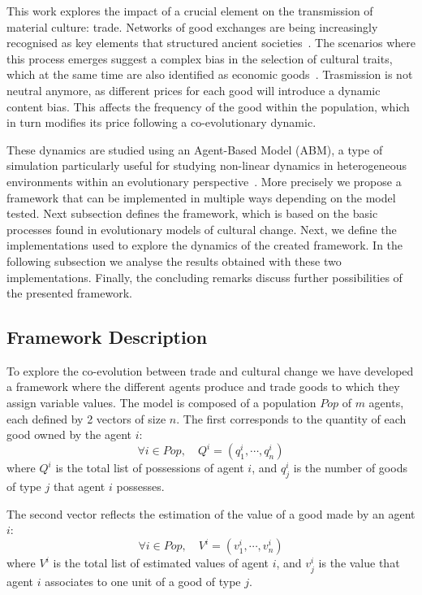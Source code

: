 \documentclass[a4paper]{article}
\begin{document}
This work explores the impact of a crucial element on the transmission of material culture: trade. Networks of good exchanges are being increasingly recognised as key elements that structured ancient societies~\cite{temin_market_2001,remesal_epnet_2014,brughmans_connecting_2010}. The scenarios where this process emerges suggest a complex bias in the selection of cultural traits, which at the same time are also identified as economic goods~\cite{bentley_specialisation_2005,macmillan_agent-based_2008}. Trasmission is not neutral anymore, as different prices for each good will introduce a dynamic content bias. This affects the frequency of the good within the population, which in turn modifies its price following a co-evolutionary dynamic.

These dynamics are studied using an Agent-Based Model (ABM), a type of simulation particularly useful for studying non-linear dynamics in heterogeneous environments within an evolutionary perspective~\cite{lake_trends_2014}. More precisely we propose a framework that can be implemented in multiple ways depending on the model tested. Next subsection defines the framework, which is based on the basic processes found in evolutionary models of cultural change. Next, we define the implementations used to explore the dynamics of the created framework. In the following subsection we analyse the results obtained with these two implementations. Finally, the concluding remarks discuss further possibilities of the presented framework.

\subsection{Framework Description}

To explore the co-evolution between trade and cultural change we have developed a framework where the different agents produce and trade goods to which they assign variable values. The model is composed of a population $Pop$ of $m$ agents, each defined by 2 vectors of size $n$. The first corresponds to the quantity of each good owned by the agent $i$: 
$$\forall i \in Pop, \quad Q^i = (q^i_1,\cdots,q^i_n) $$
where $Q^i$ is the total list of possessions of agent $i$, and $q^i_j$ is the number of goods of type $j$ that agent $i$ possesses.

The second vector reflects the estimation of the value of a good made by an agent $i$:
$$\forall i \in Pop, \quad V^i = (v^i_1,\cdots,v^i_n) $$
where $V^i$ is the total list of estimated values of agent $i$, and $v^i_j$ is the value that agent $i$ associates to one unit of a good of type $j$.
\end{document}
